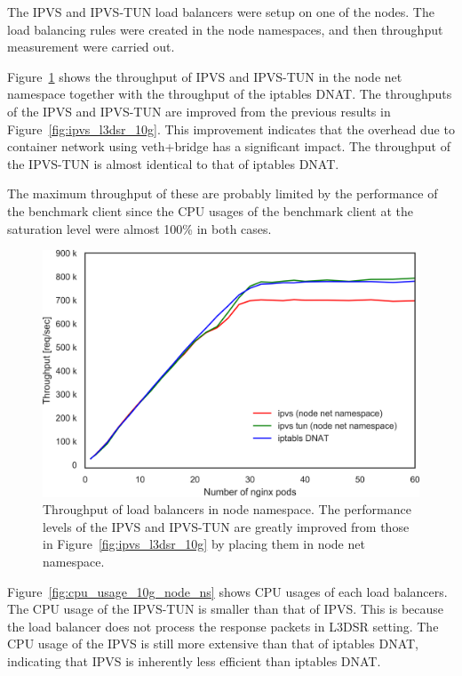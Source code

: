 The IPVS and IPVS-TUN load balancers were setup on one of the nodes. 
The load balancing rules were created in the node namespaces, and then throughput measurement were carried out.

Figure~\ref{fig:ipvs_l3dsr_10g_node_ns} shows the throughput of IPVS and IPVS-TUN in the node net namespace together with the throughput of the iptables DNAT.
The throughputs of the IPVS and IPVS-TUN are improved from the previous results in Figure~\ref{fig:ipvs_l3dsr_10g}.
This improvement indicates that the overhead due to container network using veth+bridge has a significant impact.
%
The throughput of the IPVS-TUN is almost identical to that of iptables DNAT.

The maximum throughput of these are probably limited by the performance of the benchmark client since the CPU usages of the benchmark client at the saturation level were almost 100\% in both cases.




\begin{figure}[h]
  \centering
  \includegraphics[width=0.8\columnwidth]{Figs/ipvs_l3dsr_10g_node_ns}
  \par\bigskip
  \centering
  \begin{minipage}{0.9\columnwidth}
    \caption[Throughput of load balancers in node namespace]{
      Throughput of load balancers in node namespace.
      The performance levels of the IPVS and IPVS-TUN are greatly improved from those in Figure~\ref{fig:ipvs_l3dsr_10g} by placing them in node net namespace.
    }
    \label{fig:ipvs_l3dsr_10g_node_ns}
  \end{minipage}
\end{figure}

Figure~\ref{fig:cpu_usage_10g_node_ns} shows CPU usages of each load balancers.
The CPU usage of the IPVS-TUN is smaller than that of IPVS.
This is because the load balancer does not process the response packets in L3DSR setting.
The CPU usage of the IPVS is still more extensive than that of iptables DNAT, indicating that IPVS is inherently less efficient than iptables DNAT.




